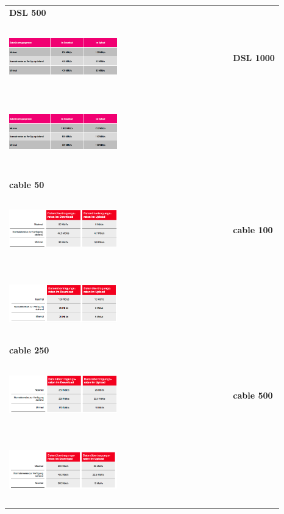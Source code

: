 \begin{table}[ht]
\begin{center}
\begin{tabular}{>{\centering}p{} >{\centering}p{}}
        \textbf{DSL 500} \\ \includegraphics[width=0.5\textwidth, height=3cm]{./pictures/dsl500vertrag.png} & \textbf{DSL 1000} \\ \includegraphics[width=0.5\textwidth, height=3cm]{./pictures/dsl1000vertrag.png} \tabularnewline
        &  \tabularnewline
        &  \tabularnewline
        \textbf{cable 50} \\ \includegraphics[width=0.5\textwidth, height=3cm]{./pictures/voda50.png} & \textbf{cable 100} \\ \includegraphics[width=0.5\textwidth, height=3cm]{./pictures/voda100.png} \tabularnewline
        \textbf{cable 250} \\ \includegraphics[width=0.5\textwidth, height=3cm]{./pictures/voda250.png} & \textbf{cable 500} \\ \includegraphics[width=0.5\textwidth, height=3cm]{./pictures/voda500.png} \tabularnewline

\end{tabular}
\end{center}
\end{table}
